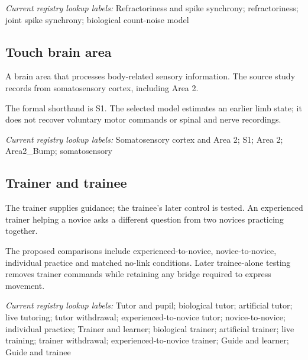 \noindent\textit{Current registry lookup labels:} Refractoriness and spike synchrony; refractoriness; joint spike synchrony; biological count-noise model\par

\begin{samepage}
\subsection*{Touch brain area}
\noindent A brain area that processes body-related sensory information. The source study records from somatosensory cortex, including Area 2.\par
\end{samepage}
\begin{samepage}
\noindent The formal shorthand is S1. The selected model estimates an earlier limb state; it does not recover voluntary motor commands or spinal and nerve recordings.\par\nopagebreak[4]

\end{samepage}


\noindent\textit{Current registry lookup labels:} Somatosensory cortex and Area 2; S1; Area 2; Area2\_Bump; somatosensory\par

\subsection*{Trainer and trainee}
\noindent The trainer supplies guidance; the trainee’s later control is tested. An experienced trainer helping a novice asks a different question from two novices practicing together.\par
\noindent The proposed comparisons include experienced-to-novice, novice-to-novice, individual practice and matched no-link conditions. Later trainee-alone testing removes trainer commands while retaining any bridge required to express movement.\par

\noindent\textit{Current registry lookup labels:} Tutor and pupil; biological tutor; artificial tutor; live tutoring; tutor withdrawal; experienced-to-novice tutor; novice-to-novice; individual practice; Trainer and learner; biological trainer; artificial trainer; live training; trainer withdrawal; experienced-to-novice trainer; Guide and learner; Guide and trainee\par

